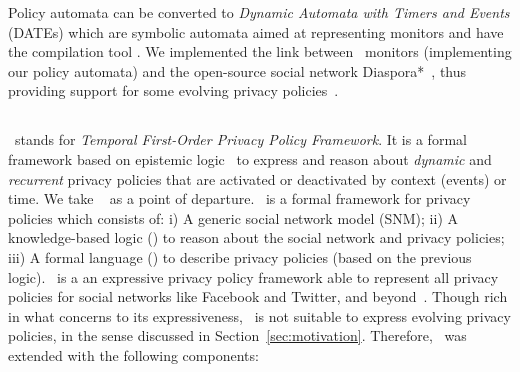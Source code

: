 Policy automata can be converted to \emph{Dynamic Automata with Timers and Events} (DATEs) \cite{CPS08lrt} which are symbolic automata aimed at representing monitors and have the compilation tool \larva. We implemented the link between \larva~monitors (implementing our policy automata) and the open-source social network Diaspora*~\cite{DiasporaWeb}, thus providing support for some evolving privacy policies~\cite{ppfDiaspora}.
\vspace{-1mm}
\subsection{\tfppf}

\tfppf~stands for {\em Temporal First-Order Privacy Policy Framework}.
It is a formal framework based on epistemic logic~\cite{FHM+95rk} to express and reason about {\em dynamic} and {\em recurrent} privacy policies that are activated or deactivated by context (events) or time. We take \fppf~\cite{PS14fpp} as a point of departure. \fppf~is a formal framework for privacy policies which consists of:
i) A generic social network model (SNM);
ii) A knowledge-based logic (\kbl) to reason about the social network and privacy policies;
iii) A formal language (\ppl) to describe privacy policies (based on the previous logic).
\fppf~is a an expressive privacy policy framework able to represent all privacy policies for social networks like Facebook and Twitter, and beyond~\cite{PS14fpp}. Though rich in what concerns to its expressiveness, \fppf~is not suitable to express evolving privacy policies, in the sense discussed in Section~\ref{sec:motivation}. Therefore, \tfppf~was extended with the following components:

